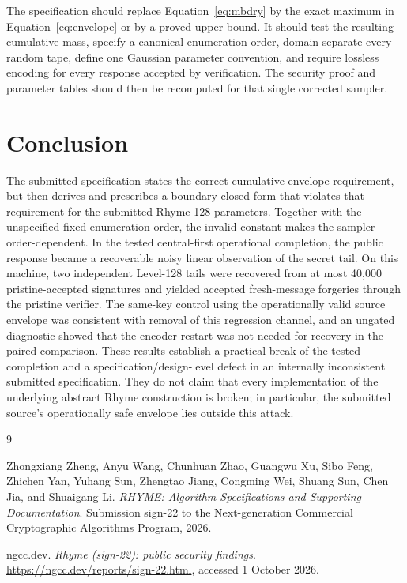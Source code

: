 \documentclass[11pt,a4paper]{article}
\begin{document}
The specification should replace Equation~\eqref{eq:mbdry} by the exact
maximum in Equation~\eqref{eq:envelope} or by a proved upper bound.  It should
test the resulting cumulative mass, specify a canonical enumeration order,
domain-separate every random tape, define one Gaussian parameter convention,
and require lossless encoding for every response accepted by verification.
The security proof and parameter tables should then be recomputed for that
single corrected sampler.

\section{Conclusion}

The submitted specification states the correct cumulative-envelope
requirement, but then derives and prescribes a boundary closed form that
violates that requirement for the submitted Rhyme-128 parameters.  Together
with the unspecified fixed enumeration order, the invalid constant makes the
sampler order-dependent.  In the tested central-first operational completion,
the public response became a recoverable noisy linear observation of the
secret tail.  On this machine, two independent Level-128
tails were recovered from at most 40,000 pristine-accepted signatures and
yielded accepted fresh-message forgeries through the pristine verifier.
The same-key control using the operationally valid source envelope was
consistent with removal of this regression channel, and an ungated diagnostic
showed that the encoder restart was not needed for recovery in the paired
comparison.  These results
establish a practical break of the tested completion and a
specification/design-level defect in an internally inconsistent
submitted specification.  They do not claim that every implementation of the
underlying abstract Rhyme construction is broken; in particular, the
submitted source's operationally safe envelope lies outside this attack.

\begin{thebibliography}{9}

Zhongxiang Zheng, Anyu Wang, Chunhuan Zhao, Guangwu Xu, Sibo Feng,
Zhichen Yan, Yuhang Sun, Zhengtao Jiang, Congming Wei, Shuang Sun,
Chen Jia, and Shuaigang Li.
\newblock \emph{RHYME: Algorithm Specifications and Supporting Documentation}.
\newblock Submission sign-22 to the Next-generation Commercial Cryptographic
Algorithms Program, 2026.

ngcc.dev.
\newblock \emph{Rhyme (sign-22): public security findings}.
\newblock \url{https://ngcc.dev/reports/sign-22.html}, accessed
1 October 2026.

\end{thebibliography}
\end{document}
